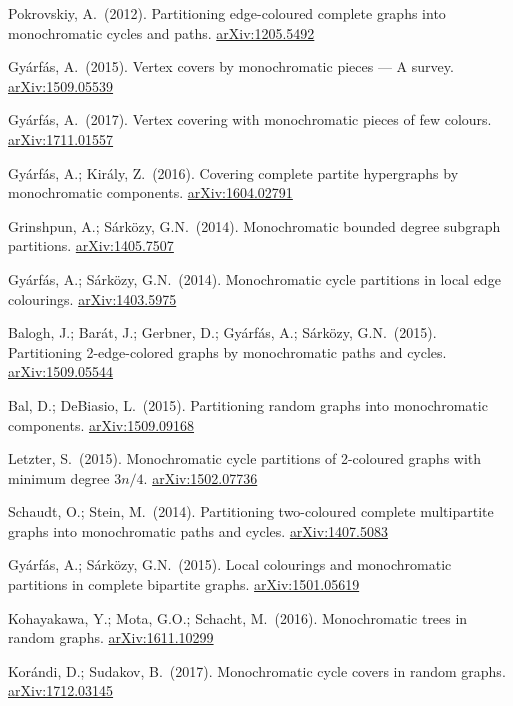 \documentclass[12pt,a4paper,twoside,openright]{book}
\theoremstyle{definition}
\newcommand{\arxiv}[1]{\href{https://arxiv.org/abs/#1}{\textcolor{linkcolor}{arXiv:#1}}}
\begin{document}
\begin{enumerate}[label={[\arabic*]}, leftmargin=2cm]
\item Pokrovskiy, A.\ (2012). Partitioning edge-coloured complete graphs into monochromatic cycles and paths. \arxiv{1205.5492}

\item Gyárfás, A.\ (2015). Vertex covers by monochromatic pieces — A survey. \arxiv{1509.05539}

\item Gyárfás, A.\ (2017). Vertex covering with monochromatic pieces of few colours. \arxiv{1711.01557}

\item Gyárfás, A.; Király, Z.\ (2016). Covering complete partite hypergraphs by monochromatic components. \arxiv{1604.02791}

\item Grinshpun, A.; Sárközy, G.N.\ (2014). Monochromatic bounded degree subgraph partitions. \arxiv{1405.7507}

\item Gyárfás, A.; Sárközy, G.N.\ (2014). Monochromatic cycle partitions in local edge colourings. \arxiv{1403.5975}

\item Balogh, J.; Barát, J.; Gerbner, D.; Gyárfás, A.; Sárközy, G.N.\ (2015). Partitioning 2-edge-colored graphs by monochromatic paths and cycles. \arxiv{1509.05544}

\item Bal, D.; DeBiasio, L.\ (2015). Partitioning random graphs into monochromatic components. \arxiv{1509.09168}

\item Letzter, S.\ (2015). Monochromatic cycle partitions of 2-coloured graphs with minimum degree $3n/4$. \arxiv{1502.07736}

\item Schaudt, O.; Stein, M.\ (2014). Partitioning two-coloured complete multipartite graphs into monochromatic paths and cycles. \arxiv{1407.5083}

\item Gyárfás, A.; Sárközy, G.N.\ (2015). Local colourings and monochromatic partitions in complete bipartite graphs. \arxiv{1501.05619}

\item Kohayakawa, Y.; Mota, G.O.; Schacht, M.\ (2016). Monochromatic trees in random graphs. \arxiv{1611.10299}

\item Korándi, D.; Sudakov, B.\ (2017). Monochromatic cycle covers in random graphs. \arxiv{1712.03145}


\end{enumerate}
\end{document}

